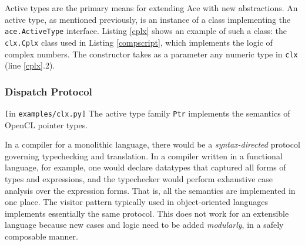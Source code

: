 Active types are the primary means for extending Ace with new abstractions. An active type, as mentioned previously, is an instance of a class implementing the \verb|ace.ActiveType| interface. Listing \ref{cplx} shows an example of such a class: the \verb|clx.Cplx| class used in Listing \ref{compscript}, which implements the logic of complex numbers. The constructor takes as a parameter any numeric type in \verb|clx| (line \ref{cplx}.2). 

\subsubsection{Dispatch Protocol}
\begin{codelisting}

\caption{\texttt{[}in \texttt{examples/clx.py]} The active type family \texttt{Ptr} implements the semantics of OpenCL pointer types.}
\label{cplx}
\end{codelisting}
In a compiler for a monolithic language, there would be a \emph{syntax-directed} protocol governing typechecking and translation. In a compiler written in a functional language, for example, one would declare datatypes that captured all forms of types and expressions, and the typechecker would perform exhaustive case analysis over the expression forms. That is, all the semantics are implemented in one place. The visitor pattern typically used in object-oriented languages implements essentially the same protocol. This does not work for an extensible language because new cases and logic need to be added \emph{modularly}, in a safely composable manner.

